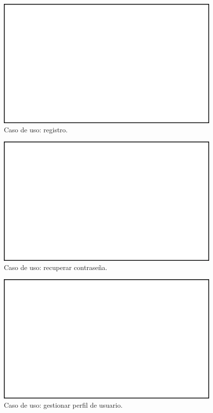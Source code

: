 \documentclass[a4paper, 12pt]{article}
\begin{document}
\begin{figure}[H]
	\begin{center}
		{\includegraphics[width=12cm]{White.png}\par}
		\caption{Caso de uso: registro.}
	\end{center}
\end{figure}


\begin{figure}[H]
	\begin{center}
		{\includegraphics[width=12cm]{White.png}\par}
		\caption{Caso de uso: recuperar contraseña.}
	\end{center}
\end{figure}


\begin{figure}[H]
	\begin{center}
		{\includegraphics[width=12cm]{White.png}\par}
		\caption{Caso de uso: gestionar perfil de usuario.}
	\end{center}
\end{figure}
\end{document}
